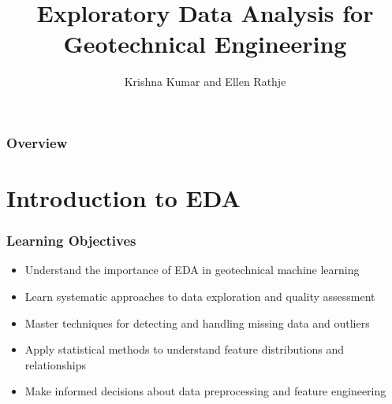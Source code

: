 \documentclass[aspectratio=169]{beamer}
\title[Exploratory Data Analysis]{Exploratory Data Analysis for Geotechnical Engineering}
\author{Krishna Kumar and Ellen Rathje} %
\institute[UT Austin] %
{
University of Texas at Austin \\
\medskip
\textit{
  \url{krishnak@utexas.edu}} %
}
\date{} %
\begin{document}
\begin{frame}
\titlepage %
\end{frame}

\begin{frame}
 \frametitle{Overview}
 \tableofcontents
\end{frame}


\section{Introduction to EDA}

\begin{frame}
\frametitle{Learning Objectives}

\begin{itemize}
    \item Understand the importance of EDA in geotechnical machine learning
    \item Learn systematic approaches to data exploration and quality assessment
    \item Master techniques for detecting and handling missing data and outliers
    \item Apply statistical methods to understand feature distributions and relationships
    \item Make informed decisions about data preprocessing and feature engineering
\end{itemize}

\vspace{1cm}
\centering
\href{https://colab.research.google.com/github/kks32-courses/ai-geotech/blob/main/docs/00-mlp-dtree/00-eda-liquefaction.ipynb}{}

\end{frame}
\end{document}
